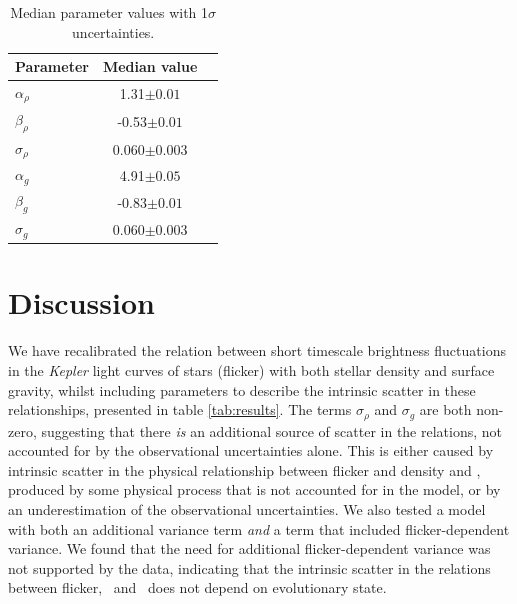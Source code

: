 \begin{table}
\begin{center}
\caption[Flicker results.]
{Median parameter values with 1$\sigma$ uncertainties.}
\begin{tabular}{lcc}
\hline\hline
Parameter & Median value \\
    \hline
$\alpha_\rho$   &    1.31$\pm 0.01$   \\
$\beta_\rho$    &    -0.53$\pm 0.01$   \\
$\sigma_\rho$   &    0.060$\pm 0.003$   \\
\hline
$\alpha_g$      &    4.91$\pm 0.05$   \\
$\beta_g$       &   -0.83$\pm 0.01$   \\
$\sigma_g$      &    0.060$\pm 0.003$   \\
    \hline
\end{tabular}
\end{center}
\end{table}
\label{tab:results}

\section{Discussion}
\label{sec:discussion}


We have recalibrated the relation between short timescale brightness
fluctuations in the {\it Kepler} light curves of stars (flicker) with both
stellar density and surface gravity, whilst including parameters to describe
the intrinsic scatter in these relationships, presented in table
\ref{tab:results}.
The terms $\sigma_\rho$ and $ \sigma_g$ are both non-zero, suggesting that
there {\it is} an additional source of scatter in the relations, not accounted
for by the observational uncertainties alone.
This is either caused by intrinsic scatter in the physical relationship
between flicker and density and \logg, produced by some physical process that
is not accounted for in the model, or by an underestimation of the
observational uncertainties.
We also tested a model with both an additional variance term {\it and} a term
that included flicker-dependent variance.
We found that the need for additional flicker-dependent variance was not
supported by the data, indicating that the intrinsic scatter in the relations
between flicker, \logg\ and \rhostar\ does not depend on evolutionary state.

